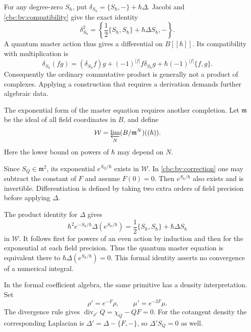 For any degree-zero $S_\hbar$, put
$\delta_{S_\hbar}=\{S_\hbar,-\}+\hbar\Delta$.
Jacobi and \eqref{cbc:bv:compatibility} give the exact identity
\begin{equation}\label{cbc:bv:quantum-square}
 \delta_{S_\hbar}^2
 =\left\{\frac12\{S_\hbar,S_\hbar\}
                   +\hbar\Delta S_\hbar,-\right\}.
\end{equation}
A quantum master action thus gives a differential on $B[[\hbar]]$.
Its compatibility with multiplication is
\begin{equation}\label{cbc:bv:product-defect}
 \delta_{S_\hbar}(fg)
 =(\delta_{S_\hbar}f)g+(-1)^{|f|}f\delta_{S_\hbar}g
                    +\hbar(-1)^{|f|}\{f,g\}.
\end{equation}
Consequently the ordinary commutative product is generally not a
product of complexes.  Applying a construction that requires a
derivation demands further algebraic data.

The exponential form of the master equation requires another
completion.  Let $\mathfrak m$ be the ideal of all field coordinates
in $B$, and define
\[
 \mathcal W=\varprojlim_N(B/\mathfrak m^N)((\hbar)).
\]
Here the lower bound on powers of $\hbar$ may depend on $N$.

Since $S_Q\in\mathfrak m^2$, its exponential $e^{S_Q/\hbar}$
exists in $\mathcal W$.  In \eqref{cbc:bv:correction} one may subtract
the constant of $F$ and assume $F(0)=0$.  Then $e^{S_\hbar/\hbar}$
also exists and is invertible.  Differentiation is defined by taking
two extra orders of field precision before applying $\Delta$.

The product identity for $\Delta$ gives
\begin{equation}\label{cbc:bv:exponential}
 \hbar^2e^{-S_\hbar/\hbar}\Delta(e^{S_\hbar/\hbar})
 =\frac12\{S_\hbar,S_\hbar\}+\hbar\Delta S_\hbar
\end{equation}
in $\mathcal W$.  It follows first for powers of an even action by
induction and then for the exponential at each field precision.
Thus the quantum master equation is equivalent there to
$\hbar\Delta(e^{S_\hbar/\hbar})=0$.  This formal identity asserts no
convergence of a numerical integral.

In the formal coefficient algebra, the same primitive has a density
interpretation.  Set
\[
 \rho'=e^{-F}\rho,\qquad \mu'=e^{-2F}\mu .
\]
The divergence rule gives
$\operatorname{div}_{\rho'}Q=\chi_Q-QF=0$.
For the cotangent density the corresponding Laplacian is
$\Delta'=\Delta-\{F,-\}$, so $\Delta'S_Q=0$ as well.

